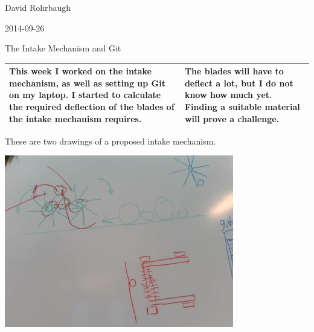 David Rohrbaugh

2014-09-26

The Intake Mechanism and Git

\begin{tabular}{|p{5cm}|p{5cm}|}
 \hline
 This week I worked on the intake mechanism, as well as setting up Git on my laptop. I started to calculate the required deflection of the blades of the intake mechanism requires.
 &
 The blades will have to deflect a lot, but I do not know how much yet. Finding a suitable material will prove a challenge.
 \\
 \hline
\end{tabular}

\medskip

These are two drawings of a proposed intake mechanism.

\begin{center}
 \includegraphics[width=10cm]{./Entries/Images/RotatingBrushes.jpg}
\end{center}

